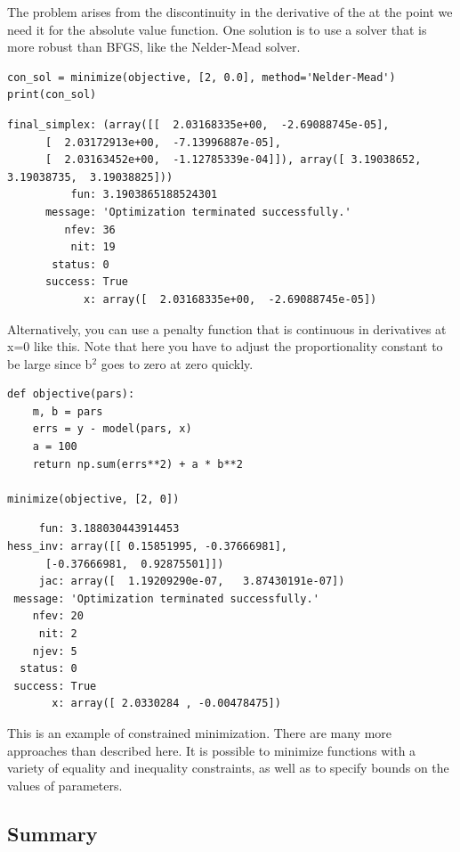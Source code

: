 \documentclass[11pt]{article}
\begin{document}
The problem arises from the discontinuity in the derivative of the at the point we need it for the absolute value function. One solution is to use a solver that is more robust than BFGS, like the Nelder-Mead solver.

\begin{verbatim}
con_sol = minimize(objective, [2, 0.0], method='Nelder-Mead')
print(con_sol)
\end{verbatim}

\begin{verbatim}
final_simplex: (array([[  2.03168335e+00,  -2.69088745e-05],
      [  2.03172913e+00,  -7.13996887e-05],
      [  2.03163452e+00,  -1.12785339e-04]]), array([ 3.19038652,  3.19038735,  3.19038825]))
          fun: 3.1903865188524301
      message: 'Optimization terminated successfully.'
         nfev: 36
          nit: 19
       status: 0
      success: True
            x: array([  2.03168335e+00,  -2.69088745e-05])

\end{verbatim}

Alternatively, you can use a penalty function that is continuous in derivatives at x=0 like this. Note that here you have to adjust the proportionality constant to be large since b\(^{\text{2}}\) goes to zero at zero quickly.

\begin{verbatim}
def objective(pars):
    m, b = pars
    errs = y - model(pars, x)
    a = 100
    return np.sum(errs**2) + a * b**2

minimize(objective, [2, 0])
\end{verbatim}

\begin{verbatim}
     fun: 3.188030443914453
hess_inv: array([[ 0.15851995, -0.37666981],
      [-0.37666981,  0.92875501]])
     jac: array([  1.19209290e-07,   3.87430191e-07])
 message: 'Optimization terminated successfully.'
    nfev: 20
     nit: 2
    njev: 5
  status: 0
 success: True
       x: array([ 2.0330284 , -0.00478475])
\end{verbatim}

This is an example of constrained minimization. There are many more approaches than described here. It is possible to minimize functions with a variety of equality and inequality constraints, as well as to specify bounds on the values of parameters.

\subsection{Summary}
\label{sec:orgc7f2d8e}
\end{document}
